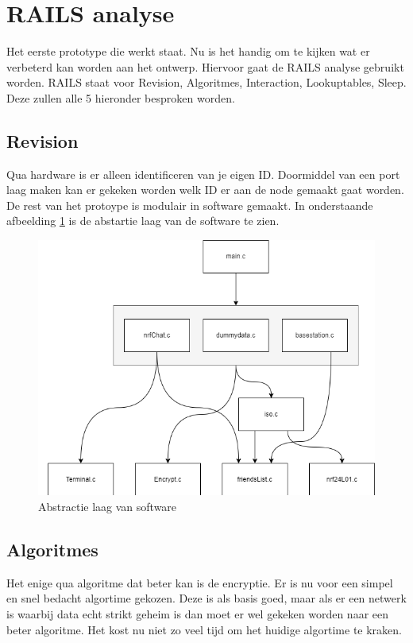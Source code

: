\section{RAILS analyse} \label{app:railsAnalysis}
Het eerste prototype die werkt staat. Nu is het handig om te kijken wat er verbeterd kan worden aan het ontwerp.
Hiervoor gaat de RAILS analyse gebruikt worden. RAILS staat voor Revision, Algoritmes, Interaction, Lookuptables, Sleep. Deze zullen 
alle 5 hieronder besproken worden. 

\subsection{Revision}
Qua hardware is er alleen identificeren van je eigen ID. Doormiddel van een port laag maken kan er gekeken worden welk ID er aan de node 
gemaakt gaat worden. De rest van het protoype is modulair in software gemaakt. In onderstaande afbeelding \ref{fig:AbstractionLayer} is de abstartie laag van de 
software te zien. 

\begin{figure}[h]
    \includegraphics[scale=0.5]{appendices/foto's/AbstractionLayer.drawio.png}
    \caption{Abstractie laag van software}
    \label{fig:AbstractionLayer}
    \end{figure}

\subsection{Algoritmes}
Het enige qua algoritme dat beter kan is de encryptie. Er is nu voor een simpel en snel bedacht algortime gekozen. Deze is als basis goed,
maar als er een netwerk is waarbij data echt strikt geheim is dan moet er wel gekeken worden naar een beter algoritme. Het kost nu niet 
zo veel tijd om het huidige algortime te kraken.

